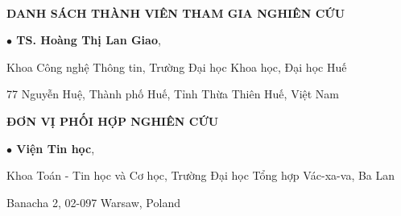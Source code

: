 \newpage
\thispagestyle{fancy}
~

\textbf{DANH SÁCH THÀNH VIÊN THAM GIA NGHIÊN CỨU}

\textbf{$\bullet$ TS. Hoàng Thị Lan Giao}, 
\vspace{-1.0ex}

Khoa Công nghệ Thông tin, Trường Đại học Khoa học, Đại học Huế
\vspace{-1.0ex}

77 Nguyễn Huệ, Thành phố Huế, Tỉnh Thừa Thiên Huế, Việt Nam

\vspace{3.0ex}
\textbf{ĐƠN VỊ PHỐI HỢP NGHIÊN CỨU}

\textbf{$\bullet$ Viện Tin học},
\vspace{-1.0ex}

Khoa Toán - Tin học và  Cơ học, Trường Đại học Tổng hợp Vác-xa-va, Ba Lan

\vspace{-1.0ex}
Banacha 2, 02-097 Warsaw, Poland
\cleardoublepage

%

